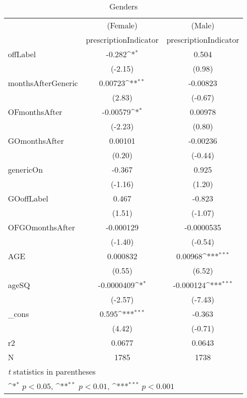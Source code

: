 \begin{table}[htbp]\centering
\def\sym#1{\ifmmode^{#1}\else\(^{#1}\)\fi}
\caption{Genders\label{tab1}}
\begin{tabular}{l*{2}{c}}
\hline\hline
            &\multicolumn{1}{c}{(Female)}&\multicolumn{1}{c}{(Male)}\\
            &\multicolumn{1}{c}{prescriptionIndicator}&\multicolumn{1}{c}{prescriptionIndicator}\\
\hline
offLabel    &      -0.282\sym{*}  &       0.504         \\
            &     (-2.15)         &      (0.98)         \\
[1em]
monthsAfterGeneric&     0.00723\sym{**} &    -0.00823         \\
            &      (2.83)         &     (-0.67)         \\
[1em]
OFmonthsAfter&    -0.00579\sym{*}  &     0.00978         \\
            &     (-2.23)         &      (0.80)         \\
[1em]
GOmonthsAfter&     0.00101         &    -0.00236         \\
            &      (0.20)         &     (-0.44)         \\
[1em]
genericOn   &      -0.367         &       0.925         \\
            &     (-1.16)         &      (1.20)         \\
[1em]
GOoffLabel  &       0.467         &      -0.823         \\
            &      (1.51)         &     (-1.07)         \\
[1em]
OFGOmonthsAfter&   -0.000129         &  -0.0000535         \\
            &     (-1.40)         &     (-0.54)         \\
[1em]
AGE         &    0.000832         &     0.00968\sym{***}\\
            &      (0.55)         &      (6.52)         \\
[1em]
ageSQ       &  -0.0000409\sym{*}  &   -0.000124\sym{***}\\
            &     (-2.57)         &     (-7.43)         \\
[1em]
\_cons      &       0.595\sym{***}&      -0.363         \\
            &      (4.42)         &     (-0.71)         \\
\hline
r2          &      0.0677         &      0.0643         \\
N           &        1785         &        1738         \\
\hline\hline
\multicolumn{3}{l}{\footnotesize \textit{t} statistics in parentheses}\\
\multicolumn{3}{l}{\footnotesize \sym{*} \(p<0.05\), \sym{**} \(p<0.01\), \sym{***} \(p<0.001\)}\\
\end{tabular}
\end{table}
